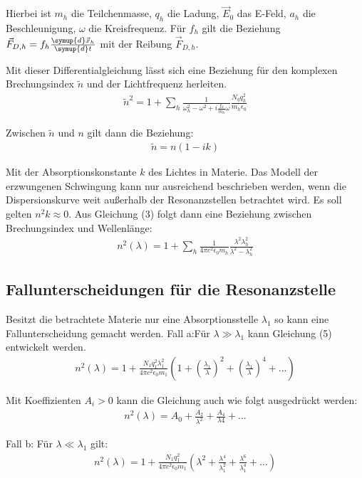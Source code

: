 Hierbei ist $m_h$ die Teilchenmasse,  $q_h$ die Ladung, $\vec{E}_0$ das E-Feld,  $a_h$ die Beschleunigung,  $\omega$ die Kreisfrequenz.
Für $f_h$ gilt die Beziehung $\vec{F}_{D,h} = f_h \frac{\symup{d} \vec{x}_h}{\symup{d}t}$ mit der Reibung $\vec{F}_{D,h}$.

Mit dieser Differentialgleichung lässt sich eine Beziehung für den komplexen Brechungsindex $\tilde{n}$ und der Lichtfrequenz herleiten.
\begin{align}
  \tilde{n}^2 = 1+ \sum_{h} \frac{1}{\omega_h^2 - \omega^2 + i \frac{f_h}{m_h}\omega} \frac{N_q q_h^2}{m_h \epsilon_0}
\end{align}

Zwischen $\tilde{n}$ und $n$ gilt dann die Beziehung:
\begin{align}
\tilde{n} = n(1-ik)
\end{align}

Mit der Absorptionskonstante $k$ des Lichtes in Materie. Das Modell der erzwungenen Schwingung kann nur ausreichend beschrieben werden, wenn die
Dispersionskurve weit außerhalb der Resonanzstellen betrachtet wird. Es soll gelten $n^2 k \approx 0$. Aus Gleichung (3) folgt dann eine
Beziehung zwischen Brechungsindex und Wellenlänge:
\begin{align}
  {n}^2 (\lambda) = 1+ \sum_{h} \frac{1}{4 \pi c^2 \epsilon_0 m_h} \frac{\lambda^2 \lambda_h^2}{\lambda^2-\lambda_h^2}
\end{align}


\subsection{Fallunterscheidungen für die Resonanzstelle}
Besitzt die betrachtete Materie nur eine Absorptionsstelle $\lambda_1$ so kann eine Fallunterscheidung gemacht werden.
Fall a:Für $\lambda \gg \lambda_1$ kann Gleichung (5) entwickelt werden.
\begin{align}
  {n}^2 (\lambda) = 1 + \frac{N_1 q_1^2 \lambda_1^2}{4 \pi c^2 \epsilon_0 m_1} \left(1+ \left(\frac{\lambda_1}{\lambda}\right)^2
  + \left(\frac{\lambda_1}{\lambda}\right)^4 + ... \right)
\end{align}

Mit Koeffizienten $A_i > 0$ kann die Gleichung auch wie folgt ausgedrückt werden:
\begin{align}
  {n}^2 (\lambda) = A_0 + \frac{A_2}{\lambda^2} + \frac{A_4}{\lambda4} + ...
\end{align}


Fall b: Für  $\lambda \ll \lambda_1$ gilt:
\begin{align}
  {n}^2 (\lambda) = 1 + \frac{N_1 q_1^2}{4 \pi c^2 \epsilon_0 m_1} \left(\lambda^2+ \frac{\lambda^4}{\lambda_1^2}
  + \frac{\lambda^6}{\lambda_1^4} + ... \right)
\end{align}

